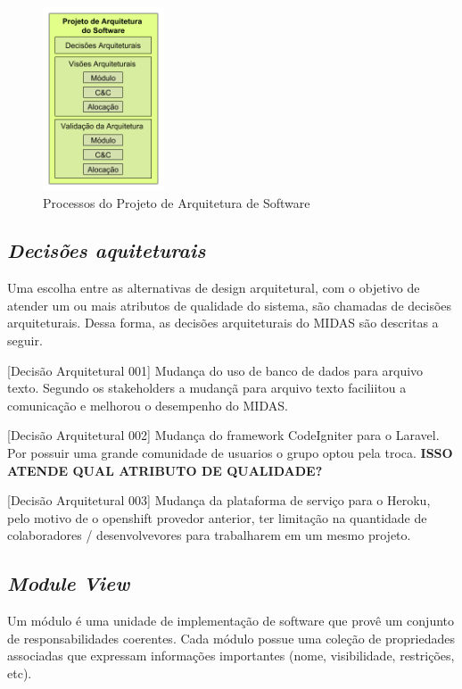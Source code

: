 \documentclass[11pt,a4paper]{article}
\begin{document}
\begin{figure} [h!]
  \centering
    \includegraphics[width=0.32\textwidth]{projarquitect}
  \caption{Processos do Projeto de Arquitetura de Software} 
  \label{fig:projarquitect}
\end{figure}

\subsection{\textit{Decisões aquiteturais}}

Uma escolha entre as alternativas de design arquitetural, com o objetivo de atender um ou mais atributos de qualidade do sistema, são chamadas de decisões arquiteturais. Dessa forma, as decisões arquiteturais do MIDAS são descritas a seguir.

[Decisão Arquitetural 001] Mudança do uso de banco de dados para arquivo texto. Segundo os stakeholders a mudançã para arquivo texto faciliitou a comunicação e melhorou o desempenho do MIDAS.

[Decisão Arquitetural 002] Mudança do framework CodeIgniter para o Laravel. Por possuir uma grande comunidade de usuarios o grupo optou pela troca.
\textbf{ISSO ATENDE QUAL ATRIBUTO DE QUALIDADE?}

[Decisão Arquitetural 003] Mudança da plataforma de serviço para o Heroku, pelo motivo de o openshift provedor anterior, ter limitação na quantidade de colaboradores / desenvolvevores para trabalharem em um mesmo projeto. 



\subsection{\textit{Module View}}
\label{subsec:mv}
Um módulo é uma unidade de implementação de software que provê um conjunto de responsabilidades coerentes. Cada módulo possue uma coleção de propriedades associadas que expressam informações importantes (nome, visibilidade, restrições, etc).
\end{document}
